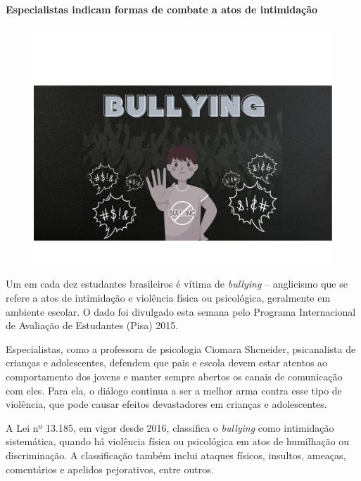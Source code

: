 \begin{myquote}

\textbf{Especialistas indicam formas de combate a atos de intimidação}

\begin{figure}[H]
\centering
\includegraphics[scale=0.25]{./imgSAEB_7_POR/media/image38.png}
\end{figure}

Um em cada dez estudantes brasileiros é vítima de \textit{bullying} -- anglicismo
que se refere a atos de intimidação e violência física ou psicológica,
geralmente em ambiente escolar. O dado foi divulgado esta semana pelo
Programa Internacional de Avaliação de Estudantes (Pisa) 2015.

Especialistas, como a professora de psicologia Ciomara Shcneider,
psicanalista de crianças e adolescentes, defendem que pais e escola
devem estar atentos ao comportamento dos jovens e manter sempre abertos
os canais de comunicação com eles. Para ela, o diálogo continua a ser a
melhor arma contra esse tipo de violência, que pode causar efeitos
devastadores em crianças e adolescentes.

A Lei nº 13.185, em vigor desde 2016, classifica o \textit{bullying} como
intimidação sistemática, quando há violência física ou psicológica em
atos de humilhação ou discriminação. A classificação também inclui
ataques físicos, insultos, ameaças, comentários e apelidos pejorativos,
entre outros.


\end{myquote}
